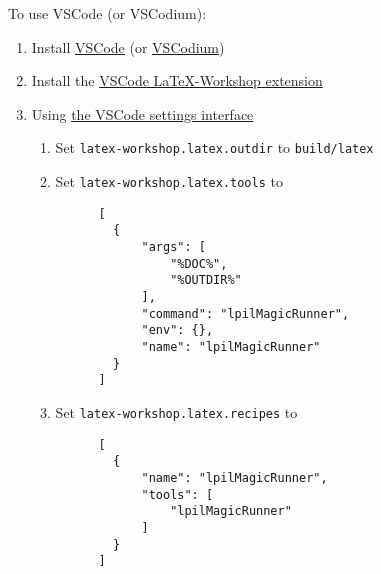 

To use VSCode (or VSCodium):

\begin{enumerate}
  \item Install \href{https://code.visualstudio.com/}{VSCode} (or
  \href{https://vscodium.com/}{VSCodium})
  \item Install the
  \href{https://open-vsx.org/extension/James-Yu/latex-workshop}{VSCode
  LaTeX-Workshop extension}
  \item Using \href{https://code.visualstudio.com/docs/getstarted/settings}{the
  VSCode settings interface}
  \begin{enumerate}
    \item Set \verb|latex-workshop.latex.outdir| to \verb|build/latex|
    \item Set \verb|latex-workshop.latex.tools| to 
    \begin{verbatim}
      [
        {
            "args": [
                "%DOC%",
                "%OUTDIR%"
            ],
            "command": "lpilMagicRunner",
            "env": {},
            "name": "lpilMagicRunner"
        }
      ]
    \end{verbatim}
    \item Set \verb|latex-workshop.latex.recipes| to
    \begin{verbatim}
      [
        {
            "name": "lpilMagicRunner",
            "tools": [
                "lpilMagicRunner"
            ]
        }
      ]
    \end{verbatim}
  \end{enumerate}
\end{enumerate}
